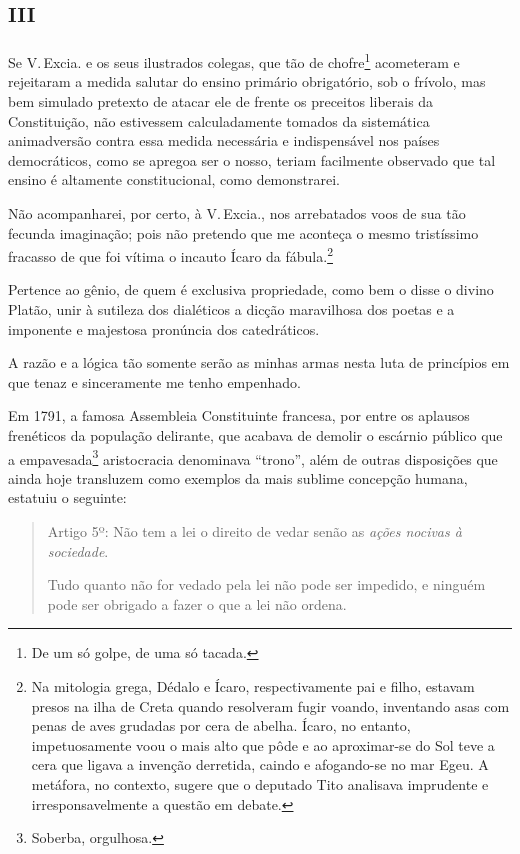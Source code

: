 

\section{\textsc{iii}}

Se V.\,Excia. e os seus ilustrados colegas, que tão de chofre\footnote{
  De um só golpe, de uma só tacada.} acometeram e rejeitaram a medida
salutar do ensino primário obrigatório, sob o frívolo, mas bem simulado
pretexto de atacar ele de frente os preceitos liberais da Constituição,
não estivessem calculadamente tomados da sistemática animadversão contra
essa medida necessária e indispensável nos países democráticos, como se
apregoa ser o nosso, teriam facilmente observado que tal ensino é
altamente constitucional, como demonstrarei.

Não acompanharei, por certo, à V.\,Excia., nos arrebatados voos de sua
tão fecunda imaginação; pois não pretendo que me aconteça o mesmo
tristíssimo fracasso de que foi vítima o incauto Ícaro da
fábula.\footnote{Na mitologia grega, Dédalo e Ícaro, respectivamente
  pai e filho, estavam presos na ilha de Creta quando resolveram fugir
  voando, inventando asas com penas de aves grudadas por cera de abelha.
  Ícaro, no entanto, impetuosamente voou o mais alto que pôde e ao
  aproximar-se do Sol teve a cera que ligava a invenção derretida,
  caindo e afogando-se no mar Egeu. A metáfora, no contexto, sugere que
  o deputado Tito analisava imprudente e irresponsavelmente a questão em
  debate.}

Pertence ao gênio, de quem é exclusiva propriedade, como bem o disse o
divino Platão, unir à sutileza dos dialéticos a dicção maravilhosa dos
poetas e a imponente e majestosa pronúncia dos catedráticos.

A razão e a lógica tão somente serão as minhas armas nesta luta de
princípios em que tenaz e sinceramente me tenho empenhado.

Em 1791, a famosa Assembleia Constituinte francesa, por entre os
aplausos frenéticos da população delirante, que acabava de demolir o
escárnio público que a empavesada\footnote{Soberba, orgulhosa.}
aristocracia denominava ``trono'', além de outras disposições que ainda
hoje transluzem como exemplos da mais sublime concepção humana, estatuiu
o seguinte:

\begin{quote}
Artigo 5º: Não tem a lei o direito de vedar senão as \emph{ações
nocivas à sociedade}.

Tudo quanto não for vedado pela lei não pode ser impedido, e ninguém
pode ser obrigado a fazer o que a lei não ordena.
\end{quote}


